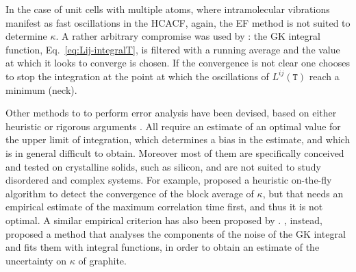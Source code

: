 \begin{LEtext}
In the case of unit cells with multiple atoms, where intramolecular vibrations manifest as fast oscillations in the HCACF, again, the EF method is not suited to determine $\kappa$. A rather arbitrary compromise was used by \citet{McGaughey2004b}: the GK integral function, Eq.~\eqref{eq:Lij-integralT}, is filtered with a running average \cite{MovingAverage} and the value at which it looks to converge is chosen. If the convergence is not clear one chooses to stop the integration at the point at which the oscillations of $L^{ij}(\mathtt{T})$ reach a minimum (neck). 

Other methods to to perform error analysis have been devised, based on either heuristic or rigorous arguments \cite{Howell2012,Chen2010,Jones2012,Wang_gk2017,Oliveira2017}. All require an estimate of an optimal value for the upper limit of integration, which determines a bias in the estimate, and which is in general difficult to obtain. Moreover most of them are specifically conceived and tested on crystalline solids, such as silicon, and are not suited to study disordered and complex systems. 
For example, \citet{Jones2012} proposed a heuristic on-the-fly algorithm to detect the convergence of the block average of $\kappa$, but that needs an empirical estimate of the maximum correlation time first, and thus it is not optimal. A similar empirical criterion has also been proposed by \citet{Wang_gk2017}. \citet{Oliveira2017}, instead, proposed a method that analyses the components of the noise of the GK integral and fits them with integral functions, in order to obtain an estimate of the uncertainty on $\kappa$ of graphite. 



\end{LEtext}
